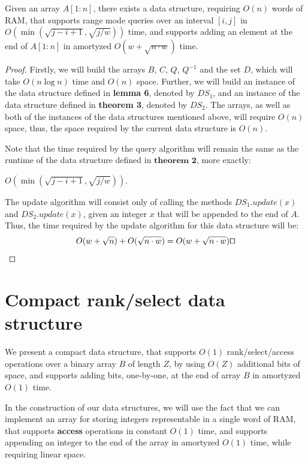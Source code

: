 \documentclass[runningheads]{llncs}
\begin{document}
\begin{theorem}
    Given an array $A[1:n]$, there exists a data structure, requiring $O(n)$ words of RAM, that supports 
    range mode queries over an interval $[i,j]$ in $O(\min ( \sqrt{j-i+1}, \sqrt{j/w} ) )$ time, and supports adding an element at the end of $A[1:n]$ in amortyzed $O(w+\sqrt{n \cdot w})$ time.     
\end{theorem}
\begin{proof}



    Firstly, we will build the arrays $B$, $C$, $Q$, $Q^{-1}$ and the set $D$, which will take $O(n\log n)$ time and $O(n)$ space.
    Further, we will build an instance of the data structure defined in \textbf{lemma 6}, denoted by $DS_1$, and an instance of the data structure defined in \textbf{theorem 3}, denoted by $DS_2$.
    The arrays, as well as both of the instances of the data structures mentioned above, will require $O(n)$ space, thus, the space required by the current data structure is $O(n)$.
    
    Note that the time required by the query algorithm will remain the same as the runtime of the data structure defined in $\textbf{theorem 2}$, more exactly: 
    
    $O(\min(\sqrt{j-i+1}, \sqrt{j/w}) )$.

    The update algorithm will consist only of calling the methods $DS_1.update(x)$ and $DS_2.update(x)$, given an integer $x$ that will be appended to the end of $A$.
    Thus, the time required by the update algorithm for this data structure will be:
    \[
        O(w+\sqrt{n})+O(\sqrt{n\cdot w}) = O(w+\sqrt{n\cdot w}) \qed
    \]

\end{proof}

\section{Compact rank/select data structure}

We present a compact data structure, that supports $O(1)$ rank/select/access operations over a binary array $B$ of length $Z$, by using $O(Z)$ additional bits of space, and supports adding bits, one-by-one, at the end 
of array $B$ in amortyzed $O(1)$ time.


In the construction of our data structures, we will use the fact that we can implement an array for storing integers representable in a single word of RAM, that supports \textbf{access} operations in constant $O(1)$ time, and supports appending an integer to the end of the array in amortyzed $O(1)$ time, while requiring linear space.
\end{document}
